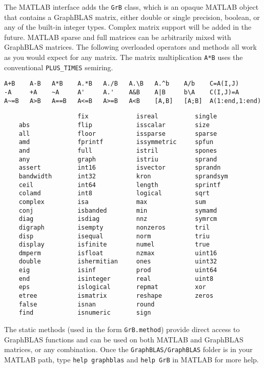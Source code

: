 \documentclass[12pt]{article}
\begin{document}
The MATLAB interface adds the \verb'GrB' class, which is an opaque MATLAB
object that contains a GraphBLAS matrix, either double or single precision,
boolean, or any of the built-in integer types.  Complex matrix support will be
added in the future.    MATLAB sparse and full matrices can be arbitrarily
mixed with GraphBLAS matrices.  The following overloaded operators and methods
all work as you would expect for any matrix.  The matrix multiplication
\verb'A*B' uses the conventional \verb'PLUS_TIMES' semiring.

{\footnotesize
\begin{verbatim}
A+B    A-B   A*B    A.*B   A./B   A.\B   A.^b    A/b    C=A(I,J)
-A     +A    ~A     A'     A.'    A&B    A|B     b\A    C(I,J)=A
A~=B   A>B   A==B   A<=B   A>=B   A<B    [A,B]   [A;B]  A(1:end,1:end) \end{verbatim}}

{\footnotesize
\begin{verbatim}
                    fix             isreal          single
    abs             flip            isscalar        size
    all             floor           issparse        sparse
    amd             fprintf         issymmetric     spfun
    and             full            istril          spones
    any             graph           istriu          sprand
    assert          int16           isvector        sprandn
    bandwidth       int32           kron            sprandsym
    ceil            int64           length          sprintf
    colamd          int8            logical         sqrt
    complex         isa             max             sum
    conj            isbanded        min             symamd
    diag            isdiag          nnz             symrcm
    digraph         isempty         nonzeros        tril
    disp            isequal         norm            triu
    display         isfinite        numel           true
    dmperm          isfloat         nzmax           uint16
    double          ishermitian     ones            uint32
    eig             isinf           prod            uint64
    end             isinteger       real            uint8
    eps             islogical       repmat          xor
    etree           ismatrix        reshape         zeros
    false           isnan           round
    find            isnumeric       sign \end{verbatim}}

The static methods (used in the form \verb'GrB.method') provide direct access
to GraphBLAS functions and can be used on both MATLAB and GraphBLAS matrices,
or any combination.  Once the \verb'GraphBLAS/GraphBLAS' folder is in your
MATLAB path, type \verb'help graphblas' and \verb'help GrB' in MATLAB
for more help.
\end{document}
